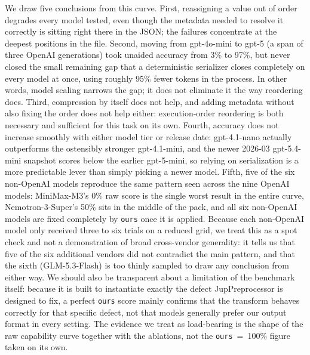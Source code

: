 \documentclass[11pt]{article}
\begin{document}
We draw five conclusions from this curve. First, reassigning a value out
of order degrades every model tested, even though the metadata needed to
resolve it correctly is sitting right there in the JSON; the failures
concentrate at the deepest positions in the file. Second, moving from
gpt-4o-mini to gpt-5 (a span of three OpenAI generations) took unaided
accuracy from 3\% to 97\%, but never closed the small remaining gap that
a deterministic serializer closes completely on every model at once,
using roughly 95\% fewer tokens in the process. In other words, model
scaling narrows the gap; it does not eliminate it the way reordering
does. Third, compression by itself does not help, and adding metadata
without also fixing the order does not help either: execution-order
reordering is both necessary and sufficient for this task on its own.
Fourth, accuracy does not increase smoothly with either model tier or
release date: gpt-4.1-nano actually outperforms the ostensibly stronger
gpt-4.1-mini, and the newer 2026-03 gpt-5.4-mini snapshot scores below
the earlier gpt-5-mini, so relying on serialization is a more predictable
lever than simply picking a newer model. Fifth, five of the six
non-OpenAI models reproduce the same pattern seen across the nine OpenAI
models: MiniMax-M3's 0\% raw score is the single worst result in the
entire curve, Nemotron-3-Super's 50\% sits in the middle of the pack, and
all six non-OpenAI models are fixed completely by \texttt{ours} once it
is applied. Because each non-OpenAI model only received three to six
trials on a reduced grid, we treat this as a spot check and not a
demonstration of broad cross-vendor generality: it tells us that five of
the six additional vendors did not contradict the main pattern, and that
the sixth (GLM-5.3-Flash) is too thinly sampled to draw any conclusion
from either way. We should also be transparent about a limitation of the
benchmark itself: because it is built to instantiate exactly the defect
JupPreprocessor is designed to fix, a perfect \texttt{ours} score mainly
confirms that the transform behaves correctly for that specific defect,
not that models generally prefer our output format in every setting. The
evidence we treat as load-bearing is the shape of the raw capability
curve together with the ablations, not the \texttt{ours}~=~100\% figure
taken on its own.
\end{document}
